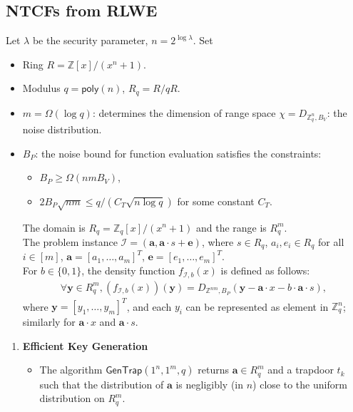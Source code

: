 \documentclass[cryptography,review,submit,pdftex,moreauthors,amsmath,amssymb,aps,strict]{Definitions/mdpi}
\begin{document}
\subsection[\appendixname~\thesubsection]{NTCFs from RLWE}
\begin{Definition} Let $\lambda$ be the security parameter, $n=2^{\log \lambda}$. Set
\begin{itemize}
    \item Ring $R=\mathbb{Z}[x]/(x^n+1)$.
    \item Modulus $q=\mathsf{poly}(n)$, $R_q=R/qR$.
    \item $m=\Omega(\log q)$: determines the dimension of range space
    $\chi = D_{\mathbb{Z}^n_q,B_V}$: the noise distribution.
    \item $B_P$: the noise bound for function evaluation satisfies the constraints:
    \begin{itemize}
        \item $B_P\geq \Omega(nmB_V)$,
        \item $2B_P\sqrt{nm}\leq q/(C_T\sqrt{n\log q})$ for some constant $C_T$.
    \end{itemize}
    The domain is $R_q=\mathbb{Z}_q[x]/(x^n+1)$ and the range is $R_q^{m}$.\\
    The problem instance $\mathcal{I}=(\mathbf{a},\mathbf{a}\cdot s+\mathbf{e})$, where $s\in R_q$, $a_i,e_i\in R_q$ for all $i\in[m]$, $\mathbf{a}=[a_1,\dots,a_m]^T$, $\mathbf{e}=[e_1,\dots,e_m]^T$.\\
    For $b\in\{0,1\}$, the density function $f_{\mathcal{I},b}(x)$ is defined as follows:
    \begin{align}
        \forall \mathbf{y}\in R_q^m, (f_{\mathcal{I},b}(x))(\mathbf{y})=D_{\mathbb{Z}^{nm},B_P}(\mathbf{y}-\mathbf{a}\cdot x - b\cdot \mathbf{a}\cdot s),
    \end{align}
    where $\mathbf{y}=[y_1,\dots,y_m]^T$, and each $y_i$ can be represented as element in $\mathbb{Z}^n_q$; similarly for $\mathbf{a}\cdot x$ and $\mathbf{a}\cdot s$.
\end{itemize}
\begin{enumerate}
    \item \textbf{Efficient Key Generation} 
        \begin{itemize}
            \item The algorithm $\mathsf{GenTrap}(1^n,1^m,q)$ returns $\mathbf{a}\in R^m_q$ and a trapdoor $t_{k}$ such that the distribution of $\mathbf{a}$ is negligibly (in $n$) close to the uniform distribution on $R^m_q$.

\end{itemize}
\end{enumerate}
\end{Definition}
\end{document}
